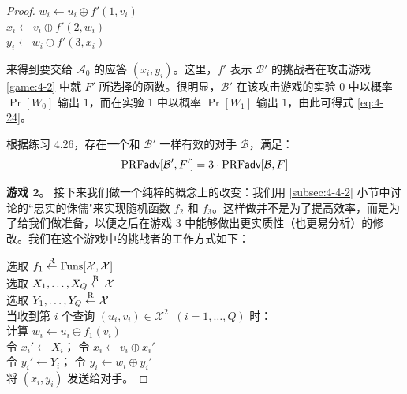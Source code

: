 \begin{proof}
\hspace*{5pt} $w_i\leftarrow u_i\oplus f'(1,v_i)$\\
\hspace*{26pt} $x_i\leftarrow v_i\oplus f'(2,w_i)$\\
\hspace*{26pt} $y_i\leftarrow w_i\oplus f'(3,x_i)$

\vspace{5pt}

\noindent
来得到要交给 $\mathcal{A}_0$ 的应答 $(x_i,y_i)$。这里，$f'$ 表示 $\mathcal{B}'$ 的挑战者在攻击游戏 \ref{game:4-2} 中就 $F'$ 所选择的函数。很明显，$\mathcal{B}'$ 在该攻击游戏的实验 $0$ 中以概率 $\Pr[W_0]$ 输出 $1$，而在实验 $1$ 中以概率 $\Pr[W_1]$ 输出 $1$，由此可得式 \ref{eq:4-24}。

根据练习 4.26，存在一个和 $\mathcal{B}'$ 一样有效的对手 $\mathcal{B}$，满足：
\begin{equation}\label{eq:4-25}
{\rm PRF\mathsf{adv}}[\mathcal{B}', F']= 3\cdot {\rm PRF\mathsf{adv}}[\mathcal{B}, F]
\end{equation}

\noindent
\textbf{游戏 $\mathbf{2}$}。
接下来我们做一个纯粹的概念上的改变：我们用 \ref{subsec:4-4-2} 小节中讨论的``忠实的侏儒"来实现随机函数 $f_2$ 和 $f_3$。这样做并不是为了提高效率，而是为了给我们做准备，以便之后在游戏 $3$ 中能够做出更实质性（也更易分析）的修改。我们在这个游戏中的挑战者的工作方式如下：

\vspace{5pt}

\hspace*{5pt} 选取 $f_1\overset{\rm R}\leftarrow{\rm Funs}[\mathcal{X},\mathcal{X}]$\\
\hspace*{26pt} 选取 $X_1,\dots,X_Q\overset{\rm R}\leftarrow\mathcal{X}$\\
\hspace*{26pt} 选取 $Y_1,\dots,Y_Q\overset{\rm R}\leftarrow\mathcal{X}$\\
\hspace*{26pt} 当收到第 $i$ 个查询 $(u_i,v_i)\in\mathcal{X}^2\;\;(i=1,\dots,Q)$ 时：\\
\hspace*{50pt} 计算 $w_i\leftarrow u_i\oplus f_1(v_i)$\\
\hspace*{50pt} 令 $x_i'\leftarrow X_i$；
				令 $x_i\leftarrow v_i\oplus x_i'$\\
\hspace*{50pt} 令 $y_i'\leftarrow Y_i$；
				令 $y_i\leftarrow w_i\oplus y_i'$\\
\hspace*{50pt} 将 $(x_i,y_i)$ 发送给对手。


\end{proof}
